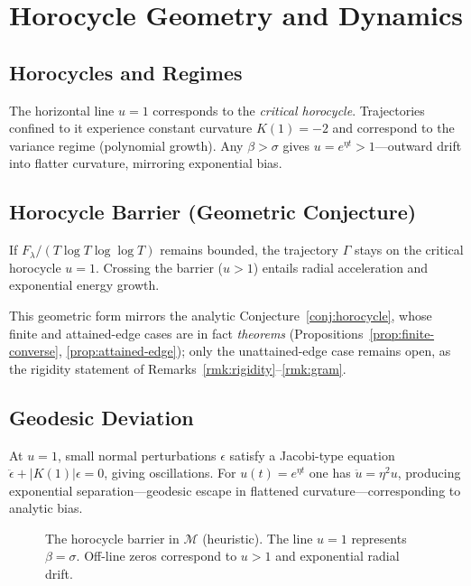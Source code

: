 \section{Horocycle Geometry and Dynamics}\label{sec:horocycle}

\subsection{Horocycles and Regimes}

The horizontal line $u=1$ corresponds to the \emph{critical horocycle}.
Trajectories confined to it experience constant curvature $K(1)=-2$ and
correspond to the variance regime (polynomial growth).
Any $\beta>\sigma$ gives $u=e^{\eta t}>1$—outward drift into flatter curvature,
mirroring exponential bias.

\subsection{Horocycle Barrier (Geometric Conjecture)}

\begin{conjecture*}
If $F_\lambda/(T\log T\log\log T)$ remains bounded, the trajectory
$\Gamma$ stays on the critical horocycle $u=1$.
Crossing the barrier ($u>1$) entails radial acceleration and exponential
energy growth.
\end{conjecture*}

This geometric form mirrors the analytic Conjecture~\ref{conj:horocycle}, whose
finite and attained-edge cases are in fact \emph{theorems}
(Propositions~\ref{prop:finite-converse}, \ref{prop:attained-edge}); only the
unattained-edge case remains open, as the rigidity statement of
Remarks~\ref{rmk:rigidity}--\ref{rmk:gram}.

\subsection{Geodesic Deviation}

At $u=1$, small normal perturbations $\epsilon$ satisfy a Jacobi-type equation
$\ddot{\epsilon}+|K(1)|\epsilon=0$, giving oscillations.
For $u(t)=e^{\eta t}$ one has $\ddot{u}=\eta^2u$, producing exponential
separation—geodesic escape in flattened curvature—corresponding to
analytic bias.

\begin{figure}[h]
\centering
{}
\caption{The horocycle barrier in $\mathcal{M}$ (heuristic).
The line $u=1$ represents $\beta=\sigma$.  Off-line zeros correspond to
$u>1$ and exponential radial drift.}
\label{fig:horocycle}
\end{figure}

